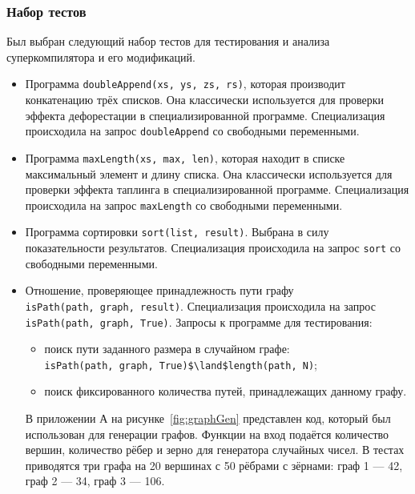 \subsubsection{Набор тестов}

Был выбран следующий набор тестов для тестирования и анализа суперкомпилятора и его модификаций.
\begin{itemize}
 \item Программа \lstinline{doubleAppend(xs, ys, zs, rs)}, которая
       производит конкатенацию трёх списков. Она классически используется
       для проверки эффекта дефорестации в специализированной программе.
       Специализация происходила на запрос \lstinline{doubleAppend} со свободными переменными.
 \item Программа \lstinline{maxLength(xs, max, len)}, которая находит в списке
       максимальный элемент и длину списка. Она классически используется
       для проверки эффекта таплинга в специализированной программе. 
       Специализация происходила на запрос \lstinline{maxLength} со свободными переменными.
 \item Программа сортировки \lstinline{sort(list, result)}. Выбрана в силу показательности
       результатов.
       Специализация происходила на запрос \lstinline{sort} со свободными переменными.
 \item Отношение, проверяющее принадлежность пути графу \\
       \lstinline{isPath(path, graph, result)}.
       Специализация происходила на запрос \lstinline{isPath(path, graph, True)}.
       Запросы к программе для тестирования:
       \begin{itemize}
       \item поиск пути заданного размера в случайном графе: \\
       \lstinline{isPath(path, graph, True)$\land$length(path, N)};
       \item поиск фиксированного количества путей, принадлежащих данному графу.
       \end{itemize}

	   В приложении А на рисунке~\ref{fig:graphGen} представлен код, который
	   был использован для генерации графов. Функции на вход
	   подаётся количество вершин, количество рёбер и зерно для генератора случайных чисел.
	   В тестах приводятся три графа на 20 вершинах с 50 рёбрами
	   с зёрнами: граф 1 --- 42, граф 2 --- 34, граф 3 --- 106.


\end{itemize}
